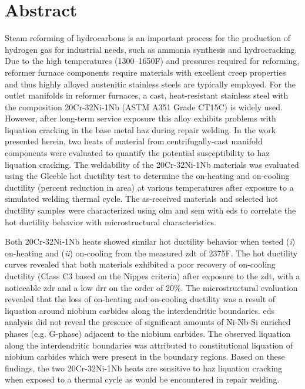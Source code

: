 \chapter*{Abstract}\label{ch:abstract}
Steam reforming of hydrocarbons is an important process for the production of hydrogen gas for industrial needs, such as ammonia synthesis and hydrocracking. Due to the high temperatures (\numrange[range-phrase=--]{1300}{1650}\textdegree{}F) and pressures required for reforming, reformer furnace components require materials with excellent creep properties and thus highly alloyed austenitic stainless steels are typically employed. For the outlet manifolds in reformer furnaces, a cast, heat-resistant stainless steel with the composition 20Cr-32Ni-1Nb (ASTM A351 Grade CT15C) is widely used. However, after long-term service exposure this alloy exhibits problems with liquation cracking in the base metal \gls{haz} during repair welding. In the work presented herein, two heats of material from centrifugally-cast manifold components were evaluated to quantify the potential susceptibility to \gls{haz} liquation cracking. The weldability of the 20Cr-32Ni-1Nb materials was evaluated using the Gleeble\texttrademark{} hot ductility test to determine the on-heating and on-cooling ductility (percent reduction in area) at various temperatures after exposure to a simulated welding thermal cycle. The as-received materials and selected hot ductility samples were characterized using \gls{olm} and \gls{sem} with \gls{eds} to correlate the hot ductility behavior with microstructural characteristics.

Both 20Cr-32Ni-1Nb heats showed similar hot ductility behavior when tested (\emph{i}) on-heating and (\emph{ii}) on-cooling from the measured \gls{zdt} of 2375\textdegree{}F. The hot ductility curves revealed that both materials exhibited a poor recovery of on-cooling ductility (Class C3 based on the Nippes criteria) after exposure to the \gls{zdt}, with a noticeable \gls{zdr} and a low \gls{drr} on the order of 20\%. The microstructural evaluation revealed that the loss of on-heating and on-cooling ductility was a result of liquation around niobium carbides along the interdendritic boundaries. \gls{eds} analysis did not reveal the presence of significant amounts of Ni-Nb-Si enriched phases (e.g. G-phase) adjacent to the niobium carbides. The observed liquation along the interdendritic boundaries was attributed to constitutional liquation of niobium carbides which were present in the boundary regions. Based on these findings, the two 20Cr-32Ni-1Nb heats are sensitive to \gls{haz} liquation cracking when exposed to a thermal cycle as would be encountered in repair welding.




